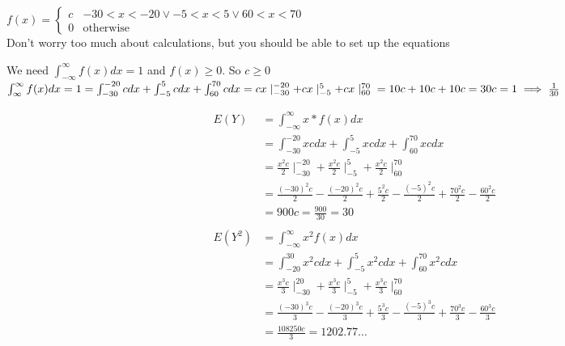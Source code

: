 \begin{enumerate}[label=(\alph*)]
\question
$f(x) = \begin{cases} c & -30 < x < -20 \lor -5 < x < 5 \lor 60 < x < 
70 \\ 0 & \text{otherwise} \end{cases}$ \\
Don’t worry too much about calculations, but you should be able to set 
up the equations
\begin{solution}[5.0cm]
We need $\int_{-\infty}^{\infty} f(x) dx = 1$ and $f(x) \ge 0$. So $c \ge 0$ \\
$\int_{\infty}^{\infty} f(x) dx = 1 = \int_{-30}^{-20} c dx + \int_{-5}^{5} c dx
+ \int_{60}^{70} c dx = cx\mid_{-30}^{-20} + cx\mid_{-5}^{5} + cx\mid_{60}^{70} \\
= 10c + 10c + 10c = 30c = 1 \implies \frac{1}{30}$

\begin{align*}
    E(Y) &= \int_{-\infty}^{\infty} x * f(x) dx \\
         &= \int_{-30}^{-20} xc dx + \int_{-5}^{5} xc dx + \int_{60}^{70} xc dx \\
         &= \frac{x^2c}{2}\mid_{-30}^{-20} + \frac{x^2c}{2}\mid_{-5}^{5} + \frac{x^2c}{2}\mid_{60}^{70} \\
         &= \frac{(-30)^2c}{2} - \frac{(-20)^2c}{2} + \frac{5^2c}{2} - \frac{(-5)^2c}{2} + \frac{70^2c}{2} - \frac{60^2c}{2} \\
         &= 900c = \frac{900}{30} = 30 \\\\
    E(Y^2) &= \int_{-\infty}^{\infty} x^2f(x) dx \\
           &= \int_{-20}^{30} x^2c dx + \int_{-5}^{5} x^2c dx + \int_{60}^{70} x^2c dx \\
           &= \frac{x^3c}{3} \mid_{-30}^{20} + \frac{x^3c}{3}\mid_{-5}^{5} + \frac{x^3c}{3}\mid_{60}^{70} \\
           &= \frac{(-30)^3c}{3} - \frac{(-20)^{3}c}{3} + \frac{5^3c}{3} - \frac{(-5)^3c}{3} + \frac{70^3c}{3} - \frac{60^3c}{3} \\
           &= \frac{108250c}{3} = 1202.77\ldots
\end{align*}
\end{solution}
\end{enumerate}
